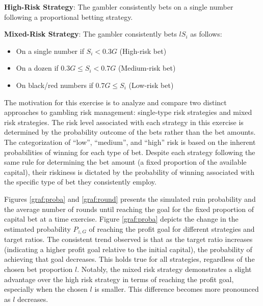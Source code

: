 \documentclass[11pt,twoside]{article}
\numberwithin{Theorem}{section}
\numberwithin{Definition}{section}
\numberwithin{Lemma}{section}
\numberwithin{Algorithm}{section}
\numberwithin{equation}{section}
\begin{document}
\begin{tcolorbox}[colback=gray!10,boxrule=0.25pt]
\textbf{High-Risk Strategy}: The gambler consistently bets on a single number following a proportional betting strategy.
\end{tcolorbox}

\begin{tcolorbox}[colback=gray!10,boxrule=0.25pt]
\textbf{Mixed-Risk Strategy}: The gambler consistently bets $lS_{i}$ as follows:
\begin{itemize}
    \item On a single number if $S_{i} < 0.3 G$ (High-risk bet)
    \item On a dozen if $0.3 G \leq S_{i} < 0.7 G$ (Medium-risk bet)
    \item On black/red numbers if $0.7 G \leq S_{i}$ (Low-risk bet)
\end{itemize}
\end{tcolorbox}

The motivation for this exercise is to analyze and compare two distinct approaches to gambling risk management: single-type risk strategies and mixed risk strategies. The risk level associated with each strategy in this exercise is determined by the probability outcome of the bets rather than the bet amounts. The categorization of “low”, “medium”, and “high” risk is based on the inherent probabilities of winning for each type of bet. Despite each strategy following the same rule for determining the bet amount (a fixed proportion of the available capital), their riskiness is dictated by the probability of winning associated with the specific type of bet they consistently employ.



Figures \ref{graf:proba} and \ref{graf:round} presents the simulated ruin probability and the average number of rounds until reaching the goal for the fixed proportion of capital bet at a time exercise.
Figure \ref{graf:proba} depicts the change in the estimated probability $P_{z,G}$ of reaching the profit goal for different strategies and target ratios. The consistent trend observed is that as the target ratio increases (indicating a higher profit goal relative to the initial capital), the probability of achieving that goal decreases. This holds true for all strategies, regardless of the chosen bet proportion $l$. Notably, the mixed risk strategy demonstrates a slight advantage over the high risk strategy in terms of reaching the profit goal, especially when the chosen $l$ is smaller. This difference becomes more pronounced as $l$ decreases.
\end{document}
